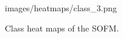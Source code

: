 \documentclass[a4paper, 12pt, titlepage]{article}
\begin{document}
\begin{figure}[p]
{        {images/heatmaps/class_3.png}
    } \\
    \caption{Class heat maps of the SOFM.}
    \label{fig:heatmap}
  \end{figure}
\end{document}
